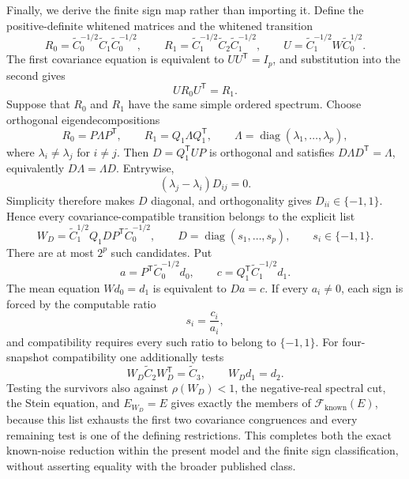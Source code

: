 Finally, we derive the finite sign map rather than importing it.  Define the positive-definite whitened matrices and the whitened transition
\[
 R_0=\widetilde C_0^{-1/2}\widetilde C_1\widetilde C_0^{-1/2},
 \qquad
 R_1=\widetilde C_1^{-1/2}\widetilde C_2\widetilde C_1^{-1/2},
 \qquad
 U=\widetilde C_1^{-1/2}W\widetilde C_0^{1/2}.
\]
The first covariance equation is equivalent to \(UU^{\mathsf T}=I_p\), and substitution into the second gives
\[
 UR_0U^{\mathsf T}=R_1.
\]
Suppose that \(R_0\) and \(R_1\) have the same simple ordered spectrum.  Choose orthogonal eigendecompositions
\[
 R_0=P\Lambda P^{\mathsf T},
 \qquad
 R_1=Q_1\Lambda Q_1^{\mathsf T},
 \qquad
 \Lambda=\operatorname{diag}(\lambda_1,\ldots,\lambda_p),
\]
where \(\lambda_i\ne\lambda_j\) for \(i\ne j\).  Then \(D=Q_1^{\mathsf T}UP\) is orthogonal and satisfies \(D\Lambda D^{\mathsf T}=\Lambda\), equivalently \(D\Lambda=\Lambda D\).  Entrywise,
\[
 (\lambda_j-\lambda_i)D_{ij}=0.
\]
Simplicity therefore makes \(D\) diagonal, and orthogonality gives \(D_{ii}\in\{-1,1\}\).  Hence every covariance-compatible transition belongs to the explicit list
\[
 W_D=\widetilde C_1^{1/2}Q_1DP^{\mathsf T}\widetilde C_0^{-1/2},
 \qquad
 D=\operatorname{diag}(s_1,\ldots,s_p),
 \qquad
 s_i\in\{-1,1\}.
\]
There are at most \(2^p\) such candidates.  Put
\[
 a=P^{\mathsf T}\widetilde C_0^{-1/2}d_0,
 \qquad
 c=Q_1^{\mathsf T}\widetilde C_1^{-1/2}d_1.
\]
The mean equation \(Wd_0=d_1\) is equivalent to \(Da=c\).  If every \(a_i\ne0\), each sign is forced by the computable ratio
\[
 s_i=\frac{c_i}{a_i},
\]
and compatibility requires every such ratio to belong to \(\{-1,1\}\).  For four-snapshot compatibility one additionally tests
\[
 W_D\widetilde C_2W_D^{\mathsf T}=\widetilde C_3,
 \qquad
 W_Dd_1=d_2.
\]
Testing the survivors also against \(\rho(W_D)<1\), the negative-real spectral cut, the Stein equation, and \(E_{W_D}=E\) gives exactly the members of \(\mathcal F_{\mathrm{known}}(E)\), because this list exhausts the first two covariance congruences and every remaining test is one of the defining restrictions.  This completes both the exact known-noise reduction within the present model and the finite sign classification, without asserting equality with the broader published class.
